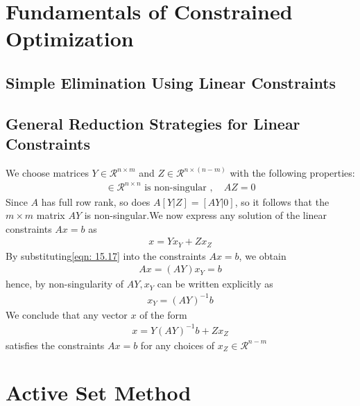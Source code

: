 \documentclass[11pt]{article}
\begin{document}
    \section{Fundamentals of Constrained Optimization} \label{sec: chap15}
    \subsection{Simple Elimination Using Linear Constraints} \label{subsec:-elimination-linear-constraints}

    \subsection{General Reduction Strategies for Linear Constraints} \label{subsec:-reduction-linear-constraints}
    We choose matrices $Y\in\mathcal{R}^{n\times m}$ and $Z\in\mathcal{R}^{n\times (n - m)}$
    with the following properties:
    \begin{align}
        [Y|Z]\in\mathcal{R}^{n\times n} \text{ is non-singular } , \quad AZ = 0 \tag{15.16}\label{chap15: partition}
    \end{align}
    Since $A$ has full row rank, so does $A[Y|Z] = [AY|0]$, so it follows that the $m\times m$ matrix $AY$
    is non-singular.We now express any solution of the linear constraints $Ax = b$ as
    \begin{align}
        x = Yx_Y + Zx_Z \tag{15.17}\label{eqn: 15.17}
    \end{align}
    By substituting\eqref{eqn: 15.17} into the constraints $Ax = b$, we obtain
    \begin{align*}
        Ax = (AY)x_Y = b
    \end{align*}
    hence, by non-singularity of $AY, x_Y$ can be written explicitly as
    \begin{align}
        x_Y = (AY)^{-1}b \tag{15.18}\label{eqn: 15.18}
    \end{align}
    We conclude that any vector $x$ of the form
    \begin{align}
        x = Y(AY)^{-1}b + Zx_Z \tag{15.19}\label{eqn: 15.19}
    \end{align}
    satisfies the constraints $Ax = b$ for any choices of $x_Z\in\mathcal{R}^{n-m}$
    \section{Active Set Method} \label{sec:asm}
    
\end{document}
